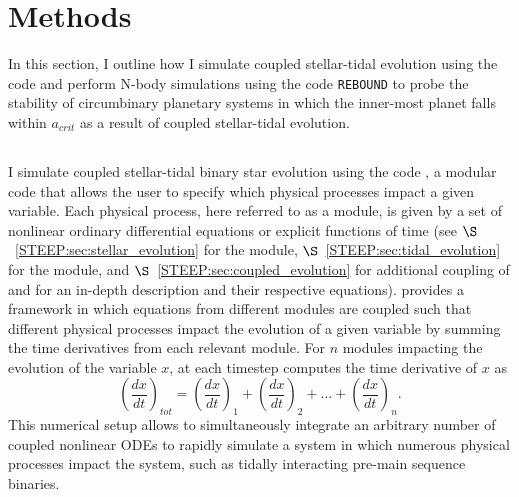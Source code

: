 

\section{Methods} \label{STEEP:sec:methods}

In this section, I outline how I simulate coupled stellar-tidal evolution using the code \vplanet \citep[][Barnes \textit{et al.}, \textit{in prep}]{Barnes2016} and perform N-body simulations using the code \texttt{REBOUND} \citep{Rein2012} to probe the stability of circumbinary planetary systems in which the inner-most planet falls within $a_{crit}$ as a result of coupled stellar-tidal evolution.


\subsection{\vplanet} \label{STEEP:sec:vplanet}

I simulate coupled stellar-tidal binary star evolution using the code \vplanet, a modular code that allows the user to specify which physical processes impact a given variable.  Each physical process, here referred to as a module, is given by a set of nonlinear ordinary differential equations or explicit functions of time (see $\S$~\ref{STEEP:sec:stellar_evolution} for the \stellar module, $\S$~\ref{STEEP:sec:tidal_evolution} for the \eqtide module, and $\S$~\ref{STEEP:sec:coupled_evolution} for additional coupling of \stellar and \eqtide for an in-depth description and their respective equations).  \vplanet provides a framework in which equations from different modules are coupled such that different physical processes impact the evolution of a given variable by summing the time derivatives from each relevant module.  For $n$ modules impacting the evolution of the variable $x$, at each timestep \vplanet computes the time derivative of $x$ as
\begin{equation} \label{STEEP:eqn:vplanet_dxdt}
\left( \frac{dx}{dt} \right)_{tot} = \left( \frac{dx}{dt} \right)_{1} + \left( \frac{dx}{dt} \right)_{2} + ... + \left( \frac{dx}{dt} \right)_{n}.
\end{equation}
This numerical setup allows \vplanet to simultaneously integrate an arbitrary number of coupled nonlinear ODEs to rapidly simulate a system in which numerous physical processes impact the system, such as tidally interacting pre-main sequence binaries.

